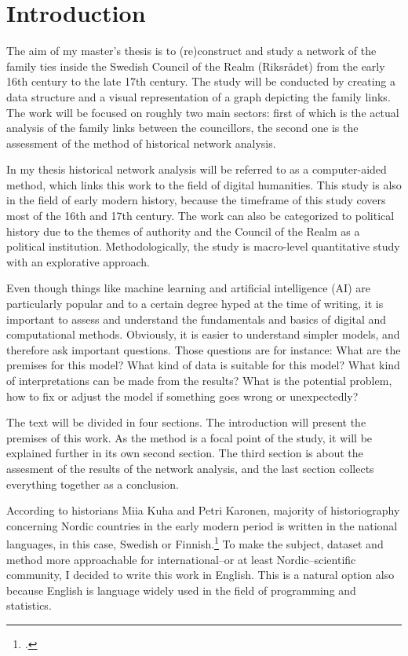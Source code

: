 \section{Introduction}
The aim of my master's thesis is to (re)construct and study a network of the family ties inside the Swedish Council of the Realm (Riksrådet) from the early 16th century to the late 17th century. The study will be conducted by creating a data structure and a visual representation of a graph depicting the family links. The work will be focused on roughly two main sectors: first of which is the actual analysis of the family links between the councillors, the second one is the assessment of the method of historical network analysis. 

In my thesis historical network analysis will be referred to as a computer-aided method, which links this work to the field of digital humanities. This study is also in the field of early modern history, because the timeframe of this study covers most of the 16th and 17th century. The work can also be categorized to political history due to the themes of authority and the Council of the Realm as a political institution. Methodologically, the study is macro-level quantitative study with an explorative approach.

Even though things like machine learning and artificial intelligence (AI) are particularly popular and to a certain degree hyped at the time of writing, it is important to assess and understand the fundamentals and basics of digital and computational methods. Obviously, it is easier to understand simpler models, and therefore ask important questions. Those questions are for instance: What are the premises for this model? What kind of data is suitable for this model? What kind of interpretations can be made from the results? What is the potential problem, how to fix or adjust the model if something goes wrong or unexpectedly?

The text will be divided in four sections. The introduction will present the premises of this work. As the method is a focal point of the study, it will be explained further in its own second section. The third section is about the assesment of the results of the network analysis, and the last section collects everything together as a conclusion. 

According to historians Miia Kuha and Petri Karonen, majority of historiography concerning Nordic countries in the early modern period is written in the national languages, in this case, Swedish or Finnish.\footcite[p. 6.]{kuha-ja-karonen} To make the subject, dataset and method more approachable for international–or at least Nordic–scientific community, I decided to write this work in English. This is a natural option also because English is language widely used in the field of programming and statistics.

